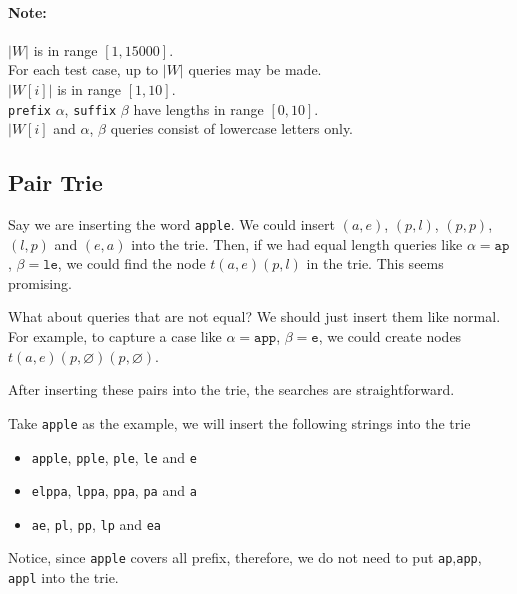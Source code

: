 \documentclass[a4paper,12pt]{article}
\begin{document}
\paragraph{Note:}
\begin{flushleft}
$|W|$ is in range $[1, 15000]$.
\\
For each test case, up to $|W|$ queries may be made.
\\
$|W[i]|$ is in range $[1, 10]$.
\\
\texttt{prefix} $\alpha$, \texttt{suffix} $\beta$ have lengths in range $[0, 10]$.
\\
$|W[i]$ and $\alpha$, $\beta$ queries consist of lowercase letters only.
\end{flushleft}
\subsection{Pair Trie}
Say we are inserting the word \texttt{apple}. We could insert $(a, e)$, $(p, l)$, $(p, p)$, $(l, p)$ and $(e, a)$ into the trie. Then, if we had equal length queries like $\alpha = \texttt{ap}$, $\beta = \texttt{le}$, we could find the node $t(a, e)(p, l)$ in the trie. This seems promising.
\par
What about queries that are not equal? We should just insert them like normal. For example, to capture a case like $\alpha = \texttt{app}$, $\beta = \texttt{e}$, we could create nodes $t(a, e)(p, \varnothing)(p, \varnothing)$.
\par
After inserting these pairs into the trie, the searches are straightforward.
\par
Take \texttt{apple} as the example, we will insert the following strings into the trie
\begin{itemize}
\item \texttt{apple}, \texttt{pple}, \texttt{ple}, \texttt{le} and \texttt{e}
\item \texttt{elppa}, \texttt{lppa}, \texttt{ppa}, \texttt{pa} and \texttt{a}
\item \texttt{ae}, \texttt{pl}, \texttt{pp}, \texttt{lp} and \texttt{ea}
\end{itemize}
Notice, since \texttt{apple} covers all prefix, therefore, we do not need to put \texttt{ap},\texttt{app}, \texttt{appl} into the trie.
\end{document}
